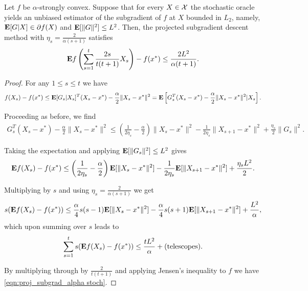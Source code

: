 \begin{theorem}
\label{thm:projectedgradalphastoch}
Let $f$ be $\alpha$-strongly convex. Suppose that for every $X \in \mathcal{X}$ the stochastic oracle yields an unbiased estimator of the subgradient of $f$ at $X$ bounded in $L_2$, namely, $\mathbf{E}[G |X]\in \partial f(X)$ and $\mathbf{E}[\|G\|^2] \leq L^2$. Then, the projected subgradient descent method with $\eta_s = \frac{2}{\alpha(s+1)}$ satisfies 
\begin{equation} \label{eqn:proj_subgrad_alpha stoch}
\mathbf{E} f\left( \sum_{s=1}^t \frac{2s}{t(t+1)}X_s \right) - f(x^*) \leq \frac{2L^2}{\alpha(t+1)}.
\end{equation}
\begin{proof}
For any $1 \leq s \leq t$ we have
\begin{align*}
	f(X_s) - f(x^*)
	\le \mathbf{E} [G_s|X_s]^T(X_s - x^*) - \frac{\alpha}{2}\|X_s - x^*\|^2
	= \mathbf{E} \left[G_s^T(X_s - x^*) - \frac{\alpha}{2}\|X_s - x^*\|^2 \large| X_s \right].
\end{align*}

Proceeding as before, we find
\begin{align*}
	G_s^T(X_s - x^*) - \frac{\alpha}{2}\|X_s - x^*\|^2
	\le \left( \frac{1}{2\eta_s} - \frac{\alpha}{2} \right) \|X_s - x^*\|^2 - \frac{1}{2\eta_s}\|X_{s+1} - x^*\|^2 + \frac{\eta_s}{2} \|G_s\|^2.
\end{align*}

Taking the expectation and applying $\mathbf{E}[\|G_s\|^2] \le L^2$ gives
\begin{align*}
	\mathbf{E} f(X_s) - f(x^*)
	\le \left( \frac{1}{2\eta_s} - \frac{\alpha}{2} \right) \mathbf{E}[\|X_s - x^*\|^2] - \frac{1}{2\eta_s}\mathbf{E} [\|X_{s+1} - x^*\|^2] + \frac{\eta_s L^2}{2}.
\end{align*}

Multiplying by $s$ and using $\eta_s = \frac{2}{\alpha(s+1)}$ we get
\begin{align*}
	s(\mathbf{E} f(X_s) - f(x^*))
	\le \frac{\alpha}{4}s(s-1) \mathbf{E}[\|X_s - x^*\|^2] - \frac{\alpha}{4}s(s+1) \mathbf{E} [\|X_{s+1} - x^*\|^2] + \frac{L^2}{\alpha},
\end{align*}
which upon summing over $s$ leads to
\[
\sum_{s=1}^t s(\mathbf{E} f(X_s) - f(x^*)) \le \frac{tL^2}{\alpha} + \text{(telescopes)}.
\]

By multiplying through by $\frac{2}{t(t+1)}$ and applying Jensen's inequality to $f$ we have \eqref{eqn:proj_subgrad_alpha stoch}.
\end{proof}
\end{theorem}

